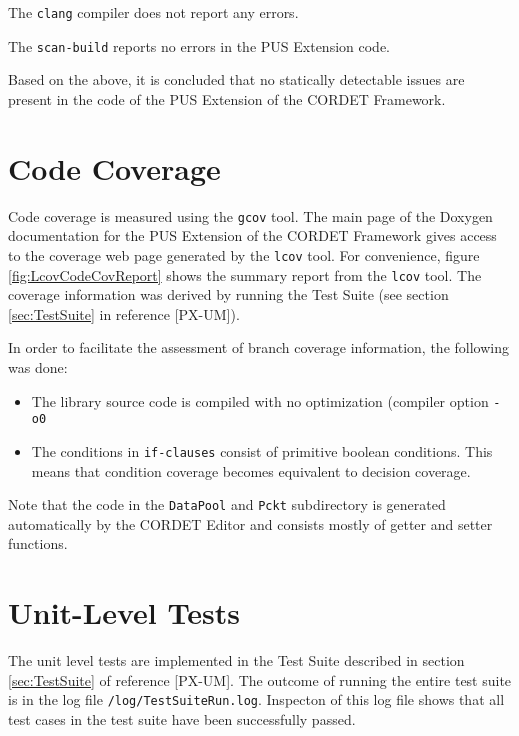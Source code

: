 \documentclass{pnp_article}
\begin{document}
The \texttt{clang} compiler does not report any errors.

The \texttt{scan-build} reports no errors in the PUS Extension code.

Based on the above, it is concluded that no statically detectable issues are present in the code of the PUS Extension of the CORDET Framework.







\section{Code Coverage}\label{sec:svrCodeCov}
Code coverage is measured using the \texttt{gcov} tool. The main page of the Doxygen documentation for the PUS Extension of the CORDET Framework gives access to the coverage web page generated by the \texttt{lcov} tool. For convenience, figure \ref{fig:LcovCodeCovReport} shows the summary report from the \texttt{lcov} tool. The coverage information was derived by running the Test Suite (see section \ref{sec:TestSuite} in reference [PX-UM]).

In order to facilitate the assessment of branch coverage information, the following was done:

\begin{itemize}
\item The library source code is compiled with no optimization (compiler option \texttt{-o0}
\item The conditions in \texttt{if-clauses} consist of primitive boolean conditions. This means that condition coverage becomes equivalent to decision coverage.
\end{itemize}  

Note that the code in the \texttt{DataPool} and \texttt{Pckt} subdirectory is generated automatically by the CORDET Editor and consists mostly of getter and setter functions.


\begin{landscape}
\end{landscape}




\section{Unit-Level Tests}\label{sec:svrUnitLeveTests}
The unit level tests are implemented in the Test Suite described in section \ref{sec:TestSuite} of reference [PX-UM]. The outcome of running the entire test suite is in the log file \texttt{/log/TestSuiteRun.log}. Inspecton of this log file shows that all test cases in the test suite have been successfully passed.
\end{document}
